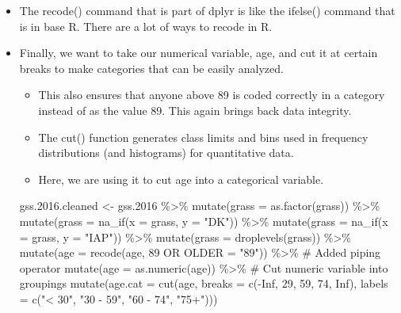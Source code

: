 \documentclass[
  letterpaper,
  DIV=11,
  numbers=noendperiod]{scrreprt}
\newenvironment{Shaded}{\begin{snugshade}}{\end{snugshade}}
\newcommand{\AttributeTok}[1]{\textcolor[rgb]{0.40,0.45,0.13}{#1}}
\newcommand{\CommentTok}[1]{\textcolor[rgb]{0.37,0.37,0.37}{#1}}
\newcommand{\ConstantTok}[1]{\textcolor[rgb]{0.56,0.35,0.01}{#1}}
\newcommand{\DecValTok}[1]{\textcolor[rgb]{0.68,0.00,0.00}{#1}}
\newcommand{\FloatTok}[1]{\textcolor[rgb]{0.68,0.00,0.00}{#1}}
\newcommand{\FunctionTok}[1]{\textcolor[rgb]{0.28,0.35,0.67}{#1}}
\newcommand{\NormalTok}[1]{\textcolor[rgb]{0.00,0.23,0.31}{#1}}
\newcommand{\OtherTok}[1]{\textcolor[rgb]{0.00,0.23,0.31}{#1}}
\newcommand{\SpecialCharTok}[1]{\textcolor[rgb]{0.37,0.37,0.37}{#1}}
\newcommand{\StringTok}[1]{\textcolor[rgb]{0.13,0.47,0.30}{#1}}
\providecommand{\tightlist}{%
  \setlength{\itemsep}{0pt}\setlength{\parskip}{0pt}}\usepackage{longtable,booktabs,array}
\begin{document}
\begin{itemize}
\item
  The recode() command that is part of dplyr is like the ifelse()
  command that is in base R. There are a lot of ways to recode in R.
\item
  Finally, we want to take our numerical variable, age, and cut it at
  certain breaks to make categories that can be easily analyzed.

  \begin{itemize}
  \tightlist
  \item
    This also ensures that anyone above 89 is coded correctly in a
    category instead of as the value 89. This again brings back data
    integrity.
  \item
    The cut() function generates class limits and bins used in frequency
    distributions (and histograms) for quantitative data.
  \item
    Here, we are using it to cut age into a categorical variable.
  \end{itemize}

\begin{Shaded}
\begin{Highlighting}[]
\NormalTok{gss.}\FloatTok{2016.}\NormalTok{cleaned }\OtherTok{\textless{}{-}}\NormalTok{ gss}\FloatTok{.2016} \SpecialCharTok{\%\textgreater{}\%}
    \FunctionTok{mutate}\NormalTok{(}\AttributeTok{grass =} \FunctionTok{as.factor}\NormalTok{(grass)) }\SpecialCharTok{\%\textgreater{}\%}
    \FunctionTok{mutate}\NormalTok{(}\AttributeTok{grass =} \FunctionTok{na\_if}\NormalTok{(}\AttributeTok{x =}\NormalTok{ grass, }\AttributeTok{y =} \StringTok{"DK"}\NormalTok{)) }\SpecialCharTok{\%\textgreater{}\%}
    \FunctionTok{mutate}\NormalTok{(}\AttributeTok{grass =} \FunctionTok{na\_if}\NormalTok{(}\AttributeTok{x =}\NormalTok{ grass, }\AttributeTok{y =} \StringTok{"IAP"}\NormalTok{)) }\SpecialCharTok{\%\textgreater{}\%}
    \FunctionTok{mutate}\NormalTok{(}\AttributeTok{grass =} \FunctionTok{droplevels}\NormalTok{(grass)) }\SpecialCharTok{\%\textgreater{}\%}
    \FunctionTok{mutate}\NormalTok{(}\AttributeTok{age =} \FunctionTok{recode}\NormalTok{(age, }\StringTok{\textasciigrave{}}\AttributeTok{89 OR OLDER}\StringTok{\textasciigrave{}} \OtherTok{=} \StringTok{"89"}\NormalTok{)) }\SpecialCharTok{\%\textgreater{}\%}
    \CommentTok{\# Added piping operator}
\FunctionTok{mutate}\NormalTok{(}\AttributeTok{age =} \FunctionTok{as.numeric}\NormalTok{(age)) }\SpecialCharTok{\%\textgreater{}\%}
    \CommentTok{\# Cut numeric variable into groupings}
\FunctionTok{mutate}\NormalTok{(}\AttributeTok{age.cat =} \FunctionTok{cut}\NormalTok{(age, }\AttributeTok{breaks =} \FunctionTok{c}\NormalTok{(}\SpecialCharTok{{-}}\ConstantTok{Inf}\NormalTok{, }\DecValTok{29}\NormalTok{, }\DecValTok{59}\NormalTok{, }\DecValTok{74}\NormalTok{, }\ConstantTok{Inf}\NormalTok{), }\AttributeTok{labels =} \FunctionTok{c}\NormalTok{(}\StringTok{"\textless{} 30"}\NormalTok{,}
    \StringTok{"30 {-} 59"}\NormalTok{, }\StringTok{"60 {-} 74"}\NormalTok{, }\StringTok{"75+"}\NormalTok{)))}


\end{Highlighting}
\end{Shaded}
\end{itemize}
\end{document}
